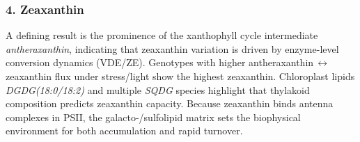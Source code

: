 \documentclass[10pt,letterpaper]{article}
\begin{document}
\begin{itemize}
\subsubsection*{4. Zeaxanthin}
A defining result is the prominence of the xanthophyll cycle intermediate \textit{antheraxanthin}, indicating that zeaxanthin variation is driven by enzyme-level conversion dynamics (VDE/ZE). Genotypes with higher antheraxanthin{\,$\leftrightarrow$\,}zeaxanthin flux under stress/light show the highest zeaxanthin.
Chloroplast lipids \textit{DGDG(18{:}0/18{:}2)} and multiple \textit{SQDG} species highlight that thylakoid composition predicts zeaxanthin capacity. Because zeaxanthin binds antenna complexes in PSII, the galacto-/sulfolipid matrix sets the biophysical environment for both accumulation and rapid turnover.



\end{itemize}
\end{document}
